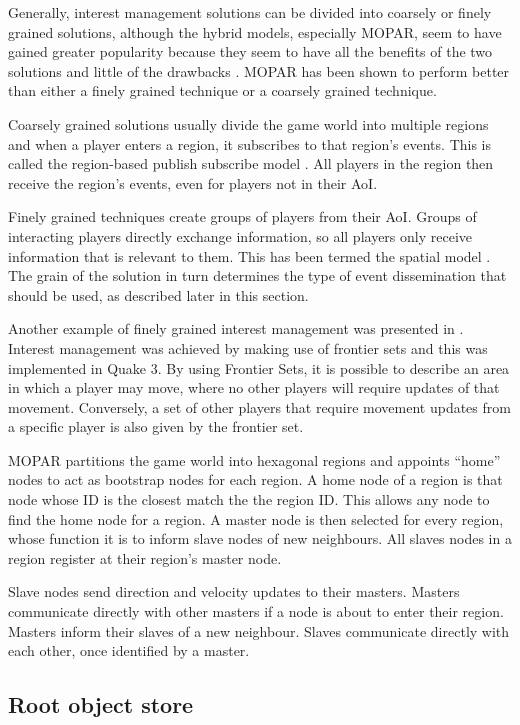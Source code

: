 Generally, interest management solutions can be divided into coarsely or finely grained solutions, although the hybrid models, especially MOPAR, seem to have gained greater popularity because they seem to have all the benefits of the two solutions and little of the drawbacks \cite{MOPAR}. MOPAR has
been shown to perform better than either a finely grained technique or a coarsely grained technique.

Coarsely grained solutions usually divide the game world into multiple regions and when a player enters a region, it subscribes to that region's
events. This is called the region-based publish subscribe model \cite{Fan_deisgn_issues_p2p}. All players in the region then receive the region's events, even for players not in their AoI.

Finely grained techniques create groups of players from their AoI. Groups of interacting players directly exchange information, so all players
only receive information that is relevant to them. This has been termed the spatial model \cite{Fan_deisgn_issues_p2p}. The grain of the solution in
turn determines the type of event dissemination that should be used, as described later in this section.

Another example of finely grained interest management was presented in \cite{IM_frontier_sets}. Interest management was achieved by making use of
frontier sets and this was implemented in Quake 3. By using Frontier Sets, it is possible to describe an area in which a player may move, where no
other players will require updates of that movement. Conversely, a set of other players that require movement updates from a specific player is also
given by the frontier set.

MOPAR partitions the game world into hexagonal regions and appoints ``home'' nodes to act as bootstrap nodes for each region. A home node of a region
is that node whose ID is the closest match the the region ID. This allows any node to find the home node for a region. A master node is then selected
for every region, whose function it is to inform slave nodes of new neighbours. All slaves nodes in a region register at their region's master node.

Slave nodes send direction and velocity updates to their masters. Masters communicate directly with other masters if a node is about to enter their
region. Masters inform their slaves of a new neighbour. Slaves communicate directly with each other, once identified by a master.

\subsection{Root object store}



